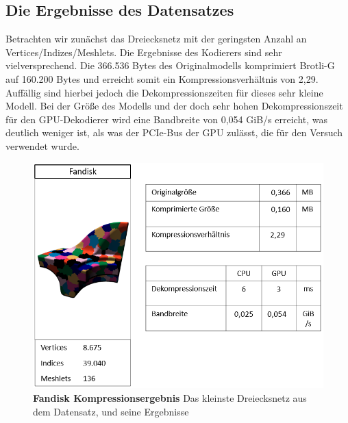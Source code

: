 \subsection{Die Ergebnisse des Datensatzes}
\label{subsec:auswertung1}
Betrachten wir zunächst das Dreiecksnetz mit der geringsten Anzahl an Vertices/Indizes/Meshlets. 
Die Ergebnisse des Kodierers sind sehr vielversprechend. 
Die 366.536 Bytes des Originalmodells komprimiert Brotli-G auf 160.200 Bytes und erreicht somit ein Kompressionsverhältnis von 2,29.
Auffällig sind hierbei jedoch die Dekompressionszeiten für dieses sehr kleine Modell. 
Bei der Größe des Modells und der doch sehr hohen Dekompressionszeit für den GPU-Dekodierer wird eine Bandbreite von 0,054 GiB/s erreicht, was deutlich weniger ist, als was der PCIe-Bus der GPU zulässt, die für den Versuch verwendet wurde.

\begin{figure}[htb]
  \centering  
  \includegraphics[scale=0.75]{Bilder/ergebnisse/fandisk.png}
  \caption[Fandisk Kompressionsergebnis]{\textbf{Fandisk Kompressionsergebnis} Das kleinste Dreiecksnetz aus dem Datensatz, und seine Ergebnisse}
  \label{fig:mesh_shading_pipeline}
\end{figure}

